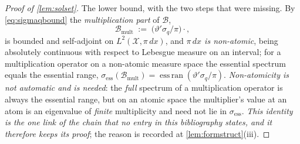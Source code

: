\begin{proof}[Proof of \cref{lem:solset}]
The lower bound, with the two steps that were missing. By \eqref{eq:sigmaqbound} the
\emph{multiplication part} of $\mathcal B$,
\begin{equation}\label{eq:Bmult}
\mathcal B_{\mathrm{mult}}\;:=\;\big(\vartheta'\sigma_q/\pi\big)\cdot{},
\end{equation}
is bounded and self-adjoint on
$L^{2}(\mathcal X,\pi\,dx)$, and \emph{$\pi\,dx$ is non-atomic}, being absolutely continuous with
respect to Lebesgue measure on an interval; for a multiplication operator on a non-atomic measure space
the essential spectrum equals the essential range,
$\sigma_{\mathrm{ess}}(\mathcal B_{\mathrm{mult}})=\operatorname{ess\,ran}(\vartheta'\sigma_q/\pi)$.
\emph{Non-atomicity is not
automatic and is needed}: the \emph{full} spectrum of a multiplication operator is always the essential
range, but on an atomic space the multiplier's value at an atom is an eigenvalue of \emph{finite}
multiplicity and need not lie in $\sigma_{\mathrm{ess}}$. \emph{This identity is the one link of the chain
that no entry in this bibliography states, and it therefore keeps its proof}; the reason is recorded at
\cref{lem:formstruct}\textup{(iii)}.

\end{proof}
